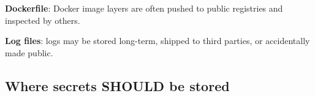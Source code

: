 \begin{codebox}[short]

\begin{Shaded}
\begin{Highlighting}[]
\OperatorTok{=} 
\OperatorTok{=} 
\end{Highlighting}
\end{Shaded}

\end{codebox}

\noindent{}\textbf{Dockerfile}: Docker image layers are often pushed to public registries and inspected by others.

\begin{codebox}[short]

\begin{Shaded}
\begin{Highlighting}[]
\end{Highlighting}
\end{Shaded}

\end{codebox}

\noindent{}\textbf{Log files}: logs may be stored long-term, shipped to third parties, or accidentally made public.

\begin{codebox}[short]

\begin{Shaded}
\begin{Highlighting}[]
\NormalTok{, os.environ[}\NormalTok{])}
\end{Highlighting}
\end{Shaded}

\end{codebox}

\subsection*{Where secrets SHOULD be stored}\label{38-security:where-secrets-should-be-stored}

